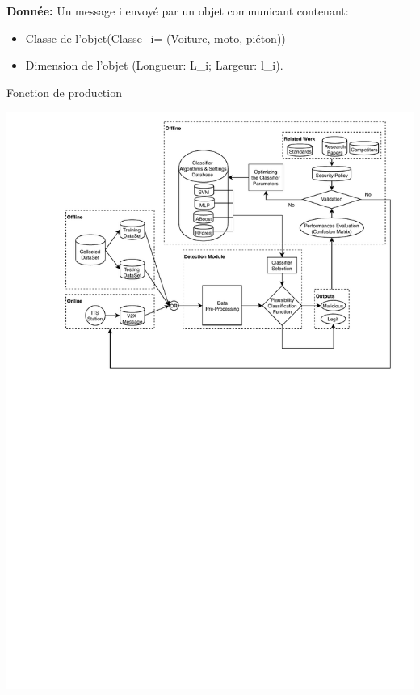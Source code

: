 \documentclass[a4paper]{report}
\begin{document}
\begin{algorithm}[H]
\SetAlgoLined
\textbf{Donnée:} Un message i envoyé par un objet communicant contenant:\\
\begin{itemize}
	\item Classe de l'objet(Classe_{i}= (Voiture, moto, piéton))
	
	\item Dimension de l’objet (Longueur: L_{i}; Largeur: l_{i}).
	
\end{itemize}

\bigbreak

\medbreak
{}
\caption{Fonction de production}
\end{algorithm}
\medbreak


\begin{center}
   \includegraphics[width=\textwidth]{MLFramework.pdf}
\end{center}
\end{document}
